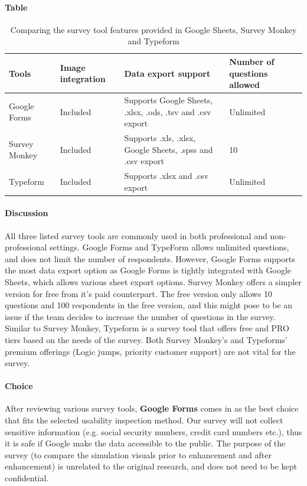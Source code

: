 \paragraph{Table}
\begin{center}
\begin{table}[H]
\begin{tabular}{ | m{10em} | m{15em} | m{15em} | m{15em} |  } 
\hline
\textbf{Tools}  & \textbf{Image integration} & \textbf{Data export support} & \textbf{Number of questions allowed} \\ \hline
Google Forms & Included  & Supports Google Sheets, .xlsx, .ods, .tsv and .csv export & Unlimited \\ \hline
Survey Monkey & Included & Supports .xls, .xlsx, Google Sheets, .spss and .csv export & 10 \\ \hline
Typeform & Included & Supports .xlsx and .csv export &  Unlimited \\ \hline 
\end{tabular}
\newline
\caption{Comparing the survey tool features provided in Google Sheets, Survey Monkey and Typeform}
\label{table:surveytool}
\end{table}
\end{center}

\newpage

\paragraph{Discussion}
All three listed survey tools are commonly used in both professional and non-professional settings.
Google Forms and TypeForm allows unlimited questions, and does not limit the number of respondents.
However, Google Forms supports the most data export option as Google Forms is tightly integrated with Google Sheets, which allows various sheet export options.
Survey Monkey offers a simpler version for free from it's paid counterpart.
The free version only allows 10 questions and 100 respondents in the free version, and this might pose to be an issue if the team decides to increase the number of questions in the survey.
Similar to Survey Monkey, Typeform is a survey tool that offers free and PRO tiers based on the needs of the survey.
Both Survey Monkey's and Typeforms' premium offerings (Logic jumps, priority customer support) are not vital for the survey.

\paragraph{Choice}
After reviewing various survey tools, \textbf{Google Forms} comes in as the best choice that fits the selected usability inspection method.
Our survey will not collect sensitive information (e.g. social security numbers, credit card numbers etc.), thus it is safe if Google make the data accessible to the public.
The purpose of the survey (to compare the simulation visuals prior to enhancement and after enhancement) is unrelated to the original research, and does not need to be kept confidential.

